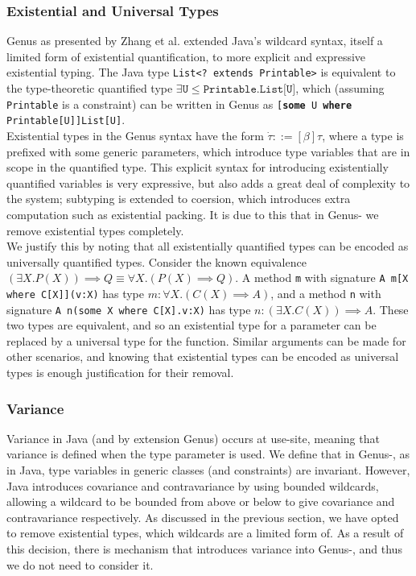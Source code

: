 \subsubsection{Existential and Universal Types}

Genus as presented by Zhang et al. extended Java's wildcard syntax, itself a limited form of existential quantification, to more explicit and expressive existential typing. The Java type \texttt{List<? extends Printable>} is equivalent to the type-theoretic quantified type $\exists\texttt{U}\leq\texttt{Printable.List[U]}$, which (assuming \texttt{Printable} is a constraint) can be written in Genus as
\texttt{[\textbf{some} U \textbf{where} \\ Printable[U]]List[U]}. \\

Existential types in the Genus syntax have the form $\Dot{\tau} ::= [\beta]\tau$, where a type is prefixed with some generic parameters, which introduce type variables that are in scope in the quantified type. This explicit syntax for introducing existentially quantified variables is very expressive, but also adds a great deal of complexity to the system; subtyping is extended to coersion, which introduces extra computation such as existential packing. It is due to this that in Genus- we remove existential types completely. \\

We justify this by noting that all existentially quantified types can be encoded as universally quantified types. Consider the known equivalence $(\exists X.P(X)) \implies Q \equiv \forall X . (P(X) \implies Q)$. A method \texttt{m} with signature \texttt{A m[X where C[X]](v:X)} has type $m: \forall X.(C(X) \implies A)$, and a method \texttt{n} with signature \texttt{A n(some X where C[X].v:X)} has type $n: (\exists X.C(X)) \implies A$. These two types are equivalent, and so an existential type for a parameter can be replaced by a universal type for the function. Similar arguments can be made for other scenarios, and knowing that existential types can be encoded as universal types is enough justification for their removal.


\subsubsection{Variance}

Variance in Java (and by extension Genus) occurs at use-site, meaning that variance is defined when the type parameter is used. We define that in Genus-, as in Java, type variables in generic classes (and constraints) are invariant. However, Java introduces covariance and contravariance by using bounded wildcards, allowing a wildcard to be bounded from above or below to give covariance and contravariance respectively. As discussed in the previous section, we have opted to remove existential types, which wildcards are a limited form of. As a result of this decision, there is mechanism that introduces variance into Genus-, and thus we do not need to consider it.

